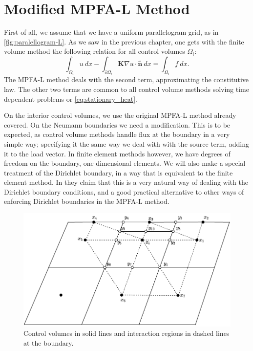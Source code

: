 \documentclass[../Main/main.tex]{subfiles}
\begin{document}
	\section{Modified MPFA-L Method}
	\label{sec:modified_mpfa-l}
	First of all, we assume that we have a uniform parallelogram grid, as in \ref{fig:paralellogram-L}. 
	As we saw in the previous chapter, one gets with the finite volume method the following relation for all control volumes $\Omega_i$:
	\begin{equation}
		\int_{\Omega_i} u \ dx - \int_{\partial \Omega_i}\bm{K}\nabla u \cdot \hat{\pmb{n}}\ dx = \int_{\Omega_i} f \ dx.
	\end{equation}
	The MPFA-L method deals with the second term, approximating the constitutive law. The other two terms are common to all control volume methods solving time dependent problems or \eqref{eq:stationary_heat}.
	\par
	On the interior control volumes, we use the original MPFA-L method already covered. On the Neumann boundaries we need a modification. This is to be expected, as control volume methods handle flux at the boundary in a very simple way; specifying it the same way we deal with with the source term, adding it to the load vector. In finite element methods however, we have degrees of freedom on the boundary, one dimensional elements. We will also make a special treatment of the Dirichlet boundary, in a way that is equivalent to the finite element method. In \cite{https://doi.org/10.1002/num.20525} they claim that this is a very natural way of dealing with the Dirichlet boundary conditions, and a good practical alternative to other ways of enforcing Dirichlet boundaries in the MPFA-L method.
	\par
	\begin{figure}
		\centering
		\includegraphics{modified_L_scheme.pdf}
		\caption{Control volumes in solid lines and interaction regions in dashed lines at the boundary.}
		\label{fig:volemes along boundary}
	\end{figure}
\end{document}
